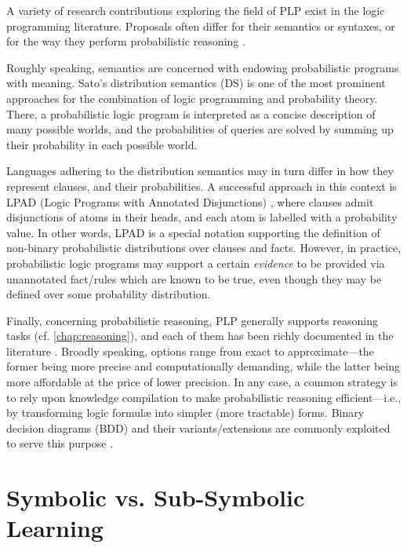 \documentclass[12pt,a4paper,openright,twoside]{book}
\begin{document}
A variety of research contributions exploring the field of PLP exist in the logic programming literature.
%
Proposals often differ for their semantics or syntaxes, or for the way they perform probabilistic reasoning \cite{fierens-2015,kimmig2011implementation,de-raedt-2007,riguzzi-swift-2011}.

Roughly speaking, semantics are concerned with endowing probabilistic programs with meaning.
%
Sato's distribution semantics (DS) \cite{sato1995,sato-1997} is one of the most prominent approaches for the combination of logic programming and probability theory.
%
There, a probabilistic logic program is interpreted as a concise description of many possible worlds, and the probabilities of queries are solved by summing up their probability in each possible world.

Languages adhering to the distribution semantics may in turn differ in how they represent clauses, and their probabilities.
%
A successful approach in this context is LPAD (Logic Programs with Annotated Disjunctions) \cite{VennekensVB04}, where clauses admit disjunctions of atoms in their heads, and each atom is labelled with a probability value.
%
In other words, LPAD is a special notation supporting the definition of non-binary probabilistic distributions over clauses and facts.
%
However, in practice, probabilistic logic programs may support a certain \emph{evidence} \cite{horwich2016probability} to be provided via unannotated fact/rules which are known to be true, even though they may be defined over some probability distribution.

Finally, concerning probabilistic reasoning, PLP generally supports reasoning tasks (cf. \cref{chap:reasoning}), and each of them has been richly documented in the literature \cite{RaedtK15}.
%
Broadly speaking, options range from exact to approximate---the former being more precise and computationally demanding, while the latter being more affordable at the price of lower precision.
%
%
In any case, a common strategy is to rely upon knowledge compilation \cite{darwiche2002knowledge} to make probabilistic reasoning efficient---i.e., by transforming logic formul\ae{} into simpler (more tractable) forms.
%
Binary decision diagrams (BDD) \cite{akers1978binary,lovato-2014} and their variants/extensions are commonly exploited to serve this purpose \cite{bellodi2013expectation,vlasselaer2014compiling}.

\section{Symbolic vs. Sub-Symbolic Learning}
\end{document}
